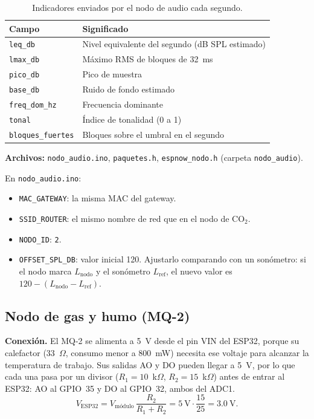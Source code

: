 \documentclass[11pt,a4paper]{article}
\newcommand{\arch}[1]{\texttt{#1}}
\begin{document}
\begin{table}[H]
\centering
\caption{Indicadores enviados por el nodo de audio cada segundo.}
\begin{tabular}{@{}ll@{}}
\toprule
\textbf{Campo} & \textbf{Significado} \\
\midrule
\texttt{leq\_db} & Nivel equivalente del segundo (dB SPL estimado) \\
\texttt{lmax\_db} & M\'aximo RMS de bloques de 32~ms \\
\texttt{pico\_db} & Pico de muestra \\
\texttt{base\_db} & Ruido de fondo estimado \\
\texttt{freq\_dom\_hz} & Frecuencia dominante \\
\texttt{tonal} & \'Indice de tonalidad (0 a 1) \\
\texttt{bloques\_fuertes} & Bloques sobre el umbral en el segundo \\
\bottomrule
\end{tabular}
\end{table}

\textbf{Archivos:} \arch{nodo\_audio.ino}, \arch{paquetes.h}, \arch{espnow\_nodo.h}
(carpeta \arch{nodo\_audio}).

\begin{completar}
En \arch{nodo\_audio.ino}:
\begin{itemize}
  \item \texttt{MAC\_GATEWAY}: la misma MAC del gateway.
  \item \texttt{SSID\_ROUTER}: el mismo nombre de red que en el nodo de CO$_2$.
  \item \texttt{NODO\_ID}: \texttt{2}.
  \item \texttt{OFFSET\_SPL\_DB}: valor inicial 120. Ajustarlo comparando con un son\'ometro:
        si el nodo marca $L_{\text{nodo}}$ y el son\'ometro $L_{\text{ref}}$, el nuevo valor es
        $120 - (L_{\text{nodo}} - L_{\text{ref}})$.
\end{itemize}
\end{completar}


\subsection{Nodo de gas y humo (MQ-2)}

\textbf{Conexi\'on.} El MQ-2 se alimenta a 5~V desde el pin VIN del ESP32, porque su calefactor
(33~$\Omega$, consumo menor a 800~mW) necesita ese voltaje para alcanzar la temperatura de
trabajo. Sus salidas AO y DO pueden llegar a 5~V, por lo que cada una pasa por un divisor
($R_1 = 10$~k$\Omega$, $R_2 = 15$~k$\Omega$) antes de entrar al ESP32: AO al GPIO~35 y DO al
GPIO~32, ambos del ADC1.
\begin{equation}
  V_{\text{ESP32}} = V_{\text{m\'odulo}}\,\frac{R_2}{R_1 + R_2} = 5~\text{V}\cdot\frac{15}{25} = 3.0~\text{V}.
\end{equation}
\end{document}

